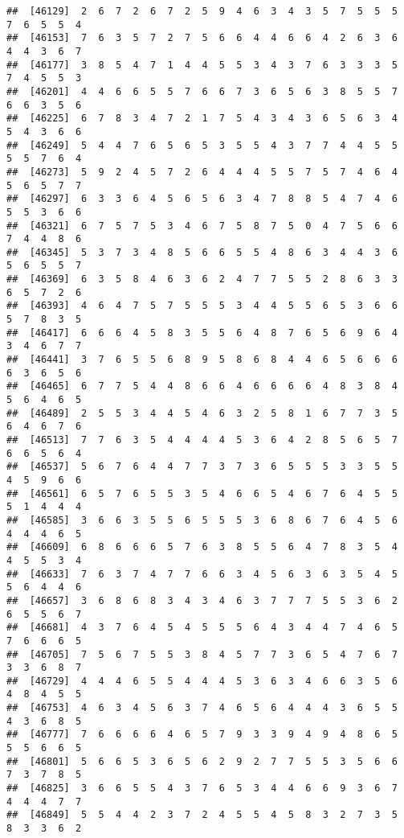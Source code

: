\documentclass[
]{book}
\begin{document}
\begin{verbatim}
##  [46129]  2  6  7  2  6  7  2  5  9  4  6  3  4  3  5  7  5  5  5  7  6  5  5  4
##  [46153]  7  6  3  5  7  2  7  5  6  6  4  4  6  6  4  2  6  3  6  4  4  3  6  7
##  [46177]  3  8  5  4  7  1  4  4  5  5  3  4  3  7  6  3  3  3  5  7  4  5  5  3
##  [46201]  4  4  6  6  5  5  7  6  6  7  3  6  5  6  3  8  5  5  7  6  6  3  5  6
##  [46225]  6  7  8  3  4  7  2  1  7  5  4  3  4  3  6  5  6  3  4  5  4  3  6  6
##  [46249]  5  4  4  7  6  5  6  5  3  5  5  4  3  7  7  4  4  5  5  5  5  7  6  4
##  [46273]  5  9  2  4  5  7  2  6  4  4  4  5  5  7  5  7  4  6  4  5  6  5  7  7
##  [46297]  6  3  3  6  4  5  6  5  6  3  4  7  8  8  5  4  7  4  6  5  5  3  6  6
##  [46321]  6  7  5  7  5  3  4  6  7  5  8  7  5  0  4  7  5  6  6  7  4  4  8  6
##  [46345]  5  3  7  3  4  8  5  6  6  5  5  4  8  6  3  4  4  3  6  5  6  5  5  7
##  [46369]  6  3  5  8  4  6  3  6  2  4  7  7  5  5  2  8  6  3  3  6  5  7  2  6
##  [46393]  4  6  4  7  5  7  5  5  5  3  4  4  5  5  6  5  3  6  6  5  7  8  3  5
##  [46417]  6  6  6  4  5  8  3  5  5  6  4  8  7  6  5  6  9  6  4  3  4  6  7  7
##  [46441]  3  7  6  5  5  6  8  9  5  8  6  8  4  4  6  5  6  6  6  6  3  6  5  6
##  [46465]  6  7  7  5  4  4  8  6  6  4  6  6  6  6  4  8  3  8  4  5  6  4  6  5
##  [46489]  2  5  5  3  4  4  5  4  6  3  2  5  8  1  6  7  7  3  5  6  4  6  7  6
##  [46513]  7  7  6  3  5  4  4  4  4  5  3  6  4  2  8  5  6  5  7  6  6  5  6  4
##  [46537]  5  6  7  6  4  4  7  7  3  7  3  6  5  5  5  3  3  5  5  4  5  9  6  6
##  [46561]  6  5  7  6  5  5  3  5  4  6  6  5  4  6  7  6  4  5  5  5  1  4  4  4
##  [46585]  3  6  6  3  5  5  6  5  5  5  3  6  8  6  7  6  4  5  6  4  4  4  6  5
##  [46609]  6  8  6  6  6  5  7  6  3  8  5  5  6  4  7  8  3  5  4  4  5  5  3  4
##  [46633]  7  6  3  7  4  7  7  6  6  3  4  5  6  3  6  3  5  4  5  5  6  4  4  6
##  [46657]  3  6  8  6  8  3  4  3  4  6  3  7  7  7  5  5  3  6  2  6  5  5  6  7
##  [46681]  4  3  7  6  4  5  4  5  5  5  6  4  3  4  4  7  4  6  5  7  6  6  6  5
##  [46705]  7  5  6  7  5  5  3  8  4  5  7  7  3  6  5  4  7  6  7  3  3  6  8  7
##  [46729]  4  4  4  6  5  5  4  4  4  5  3  6  3  4  6  6  3  5  6  4  8  4  5  5
##  [46753]  4  6  3  4  5  6  3  7  4  6  5  6  4  4  4  3  6  5  5  4  3  6  8  5
##  [46777]  7  6  6  6  6  4  6  5  7  9  3  3  9  4  9  4  8  6  5  5  5  6  6  5
##  [46801]  5  6  6  5  3  6  5  6  2  9  2  7  7  5  5  3  5  6  6  7  3  7  8  5
##  [46825]  3  6  6  5  5  4  3  7  6  5  3  4  4  6  6  9  3  6  7  4  4  4  7  7
##  [46849]  5  5  4  4  2  3  7  2  4  5  5  4  5  8  3  2  7  3  5  8  3  3  6  2

\end{verbatim}
\end{document}
